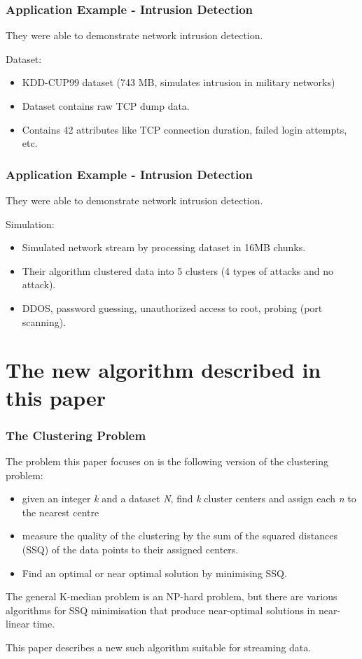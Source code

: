 \documentclass{beamer}
\begin{document}
\frame
{
  \frametitle{Application Example - Intrusion Detection}
  
  They were able to demonstrate network intrusion detection. \newline

  Dataset:
  \begin{itemize}
    \item KDD-CUP99 dataset (743 MB, simulates intrusion in military networks)
    \item Dataset contains raw TCP dump data.
    \item Contains 42 attributes like TCP connection duration, failed login attempts, etc.
    \newline
  \end{itemize}
}

\frame
{
  \frametitle{Application Example - Intrusion Detection}

  They were able to demonstrate network intrusion detection. \newline

  Simulation:
  \begin{itemize}
    \item Simulated network stream by processing dataset in 16MB chunks.
    \item Their algorithm clustered data into 5 clusters (4 types of attacks and no attack).
    \item DDOS, password guessing, unauthorized access to root, probing (port scanning). 
  \end{itemize}
}

\section{The new algorithm described in this paper}

\frame
{
  \frametitle{The Clustering Problem}

  The problem this paper focuses on is the following version of the
  clustering problem: 
  
  \begin{itemize}
  \item given an integer {\em k} and a dataset {\em N}, find {\em k}
    cluster centers and assign each {\em n} to the nearest centre
  \item measure the quality of the clustering by the sum of the
    squared distances (SSQ) of the data points to their assigned centers.
  \item Find an optimal or near optimal solution by minimising SSQ.
  \end{itemize}

  The general K-median problem is an NP-hard problem, but there are
  various algorithms for SSQ minimisation that produce near-optimal
  solutions in near-linear time.

  \bigskip
  This paper describes a new such algorithm suitable for streaming
  data.
  
}
\end{document}
